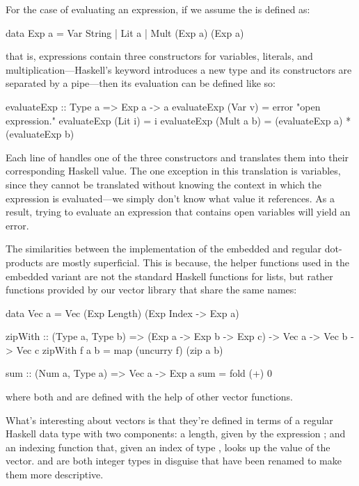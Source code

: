 \documentclass[../main.tex]{subfiles}
\begin{document}
For the case of evaluating an expression, if we assume the  is defined as:

\begin{code}
data Exp a = Var String | Lit a | Mult (Exp a) (Exp a)
\end{code}

\noindent that is, expressions contain three constructors for variables, literals, and multiplication---Haskell's  keyword introduces a new type and its constructors are separated by a pipe---then its evaluation can be defined like so:

\begin{code}
evaluateExp :: Type a => Exp a -> a
evaluateExp (Var v)    = error "open expression."
evaluateExp (Lit i)    = i
evaluateExp (Mult a b) = (evaluateExp a) * (evaluateExp b)
\end{code}

\noindent Each line of  handles one of the three constructors and translates them into their corresponding Haskell value. The one exception in this translation is variables, since they cannot be translated without knowing the context in which the expression is evaluated---we simply don't know what value it references. As a result, trying to evaluate an expression that contains open variables will yield an error.

The similarities between the implementation of the embedded and regular dot-products are mostly superficial. This is because, the helper functions used in the embedded variant are not the standard Haskell functions for lists, but rather functions provided by our vector library that share the same names:

\begin{code}
data Vec a = Vec (Exp Length) (Exp Index -> Exp a)

zipWith :: (Type a, Type b)
  => (Exp a -> Exp b -> Exp c)
  ->  Vec a -> Vec b -> Vec c
zipWith f a b = map (uncurry f) (zip a b)

sum :: (Num a, Type a) => Vec a -> Exp a
sum = fold (+) 0
\end{code}

\noindent where both  and  are defined with the help of other vector functions.

What's interesting about vectors is that they're defined in terms of a regular Haskell data type with two components: a length, given by the expression ; and an indexing function  that, given an index of type , looks up the value  of the vector.  and  are both integer types in disguise that have been renamed to make them more descriptive.
\end{document}
